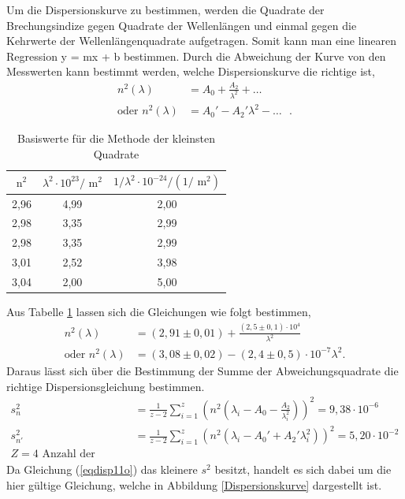 Um die Dispersionskurve zu bestimmen, werden die Quadrate der Brechungsindize
gegen Quadrate der Wellenlängen und einmal gegen die Kehrwerte der Wellenlängenquadrate aufgetragen.
Somit kann man eine linearen Regression y = mx + b bestimmen. Durch die Abweichung der
Kurve von den Messwerten kann bestimmt werden, welche Dispersionskurve \cite{anleitung} die richtige ist,
\begin{align}
n^2(\lambda)&=A_0+\frac{A_2}{\lambda^2}+\ldots \label{eqdisp11o} \\
\text{oder } n^2(\lambda)&=A_0'-A_2'\lambda^2-\ldots \label{eqdisp11ao}\text{ }.
\end{align}
\begin{table}[h]
	\begin{center}
		\begin{tabular}{ccc}
			$\text{n}^2$&$\lambda^2\cdot 10^{23}/\text{ m}^2$&$1/\lambda^2\cdot 10^{-24}/(1/\text{ m}^2)$ \\ \hline
			2,96&4,99&2,00\\
			2,98&3,35&2,99\\
			2,98&3,35&2,99\\
			3,01&2,52&3,98\\
			3,04&2,00&5,00
		\end{tabular}
		\caption{Basiswerte für die Methode der kleinsten Quadrate}
		\label{tabwerteo}
	\end{center}
\end{table}
Aus Tabelle \ref{tabwerteo} lassen sich die Gleichungen wie folgt bestimmen,
\begin{align}
n^2(\lambda)&=(2,91\pm0,01)+\frac{(2,5\pm0,1)\cdot 10^4}{\lambda^2} \\
\text{oder } n^2(\lambda)&=(3,08\pm0,02)-(2,4\pm0,5)\cdot 10^{-7}\lambda^2.
\end{align}
Daraus lässt sich über die Bestimmung der Summe der Abweichungsquadrate\cite{anleitung} die richtige
Dispersionsgleichung bestimmen.
\begin{align}
s_n^2&=\frac{1}{z-2}\sum_{i=1}^z\left( n^2(\lambda_i - A_0 - \frac{A_2}{\lambda_i^2})\right)^2= 9,38\cdot 10^{-6}\\ 
s_{n'}^2&=\frac{1}{z-2}\sum_{i=1}^z\left( n^2(\lambda_i - A_0' + A_2'\lambda_i^2)\right)^2= 5,20\cdot 10^{-2}\\ 
Z=4 \text{ Anzahl der Messwertepaare}
\end{align}
Da Gleichung (\ref{eqdisp11o}) das kleinere $s^2$ besitzt, handelt es sich dabei um die hier gültige Gleichung, 
welche in Abbildung \ref{Dispersionskurve} dargestellt ist.
